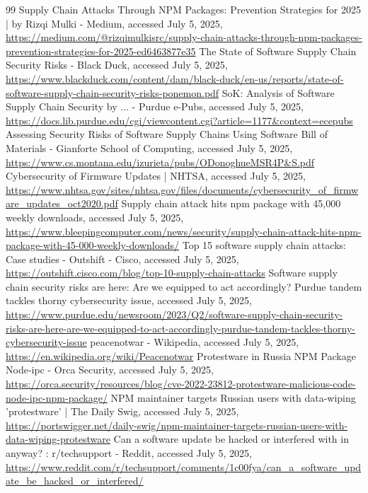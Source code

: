 \documentclass{article}
\begin{document}
\begin{thebibliography}{99}
\sloppy
{}Supply Chain Attacks Through NPM Packages: Prevention Strategies for 2025 | by Rizqi Mulki - Medium, accessed July 5, 2025, \url{https://medium.com/@rizqimulkisrc/supply-chain-attacks-through-npm-packages-prevention-strategies-for-2025-ed6463877e35}
The State of Software Supply Chain Security Risks - Black Duck, accessed July 5, 2025, \url{https://www.blackduck.com/content/dam/black-duck/en-us/reports/state-of-software-supply-chain-security-risks-ponemon.pdf}
SoK: Analysis of Software Supply Chain Security by ... - Purdue e-Pubs, accessed July 5, 2025, \url{https://docs.lib.purdue.edu/cgi/viewcontent.cgi?article=1177&context=ecepubs}
Assessing Security Risks of Software Supply Chains Using Software Bill of Materials - Gianforte School of Computing, accessed July 5, 2025, \url{https://www.cs.montana.edu/izurieta/pubs/ODonoghueMSR4P&S.pdf}
Cybersecurity of Firmware Updates | NHTSA, accessed July 5, 2025, \url{https://www.nhtsa.gov/sites/nhtsa.gov/files/documents/cybersecurity\_of\_firmware\_updates\_oct2020.pdf}
Supply chain attack hits npm package with 45,000 weekly downloads, accessed July 5, 2025, \url{https://www.bleepingcomputer.com/news/security/supply-chain-attack-hits-npm-package-with-45-000-weekly-downloads/}
Top 15 software supply chain attacks: Case studies - Outshift - Cisco, accessed July 5, 2025, \url{https://outshift.cisco.com/blog/top-10-supply-chain-attacks}
Software supply chain security risks are here: Are we equipped to act accordingly? Purdue tandem tackles thorny cybersecurity issue, accessed July 5, 2025, \url{https://www.purdue.edu/newsroom/2023/Q2/software-supply-chain-security-risks-are-here-are-we-equipped-to-act-accordingly-purdue-tandem-tackles-thorny-cybersecurity-issue}
peacenotwar - Wikipedia, accessed July 5, 2025, \url{https://en.wikipedia.org/wiki/Peacenotwar}
Protestware in Russia NPM Package Node-ipc - Orca Security, accessed July 5, 2025, \url{https://orca.security/resources/blog/cve-2022-23812-protestware-malicious-code-node-ipc-npm-package/}
NPM maintainer targets Russian users with data-wiping 'protestware' | The Daily Swig, accessed July 5, 2025, \url{https://portswigger.net/daily-swig/npm-maintainer-targets-russian-users-with-data-wiping-protestware}
Can a software update be hacked or interfered with in anyway? : r/techsupport - Reddit, accessed July 5, 2025, \url{https://www.reddit.com/r/techsupport/comments/1c00fya/can\_a\_software\_update\_be\_hacked\_or\_interfered/}

\end{thebibliography}
\end{document}
